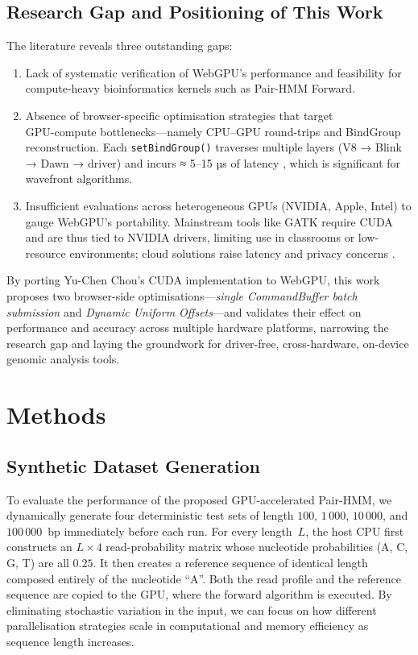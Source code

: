 \documentclass[PhD]{PHlab-thesis}
\begin{document}
\section{Research Gap and Positioning of This Work}
The literature reveals three outstanding gaps:

\begin{enumerate}
  \item Lack of systematic verification of WebGPU's performance and feasibility for compute-heavy bioinformatics kernels such as Pair-HMM Forward.
  \item Absence of browser-specific optimisation strategies that target \\GPU-compute bottlenecks—namely CPU–GPU round-trips and BindGroup reconstruction. Each \verb|setBindGroup()| traverses multiple layers (V8 → Blink → Dawn → driver) and incurs ≈ 5–15 µs of latency \cite{Chrome2024-blog}, which is significant for wavefront algorithms.
  \item Insufficient evaluations across heterogeneous GPUs (NVIDIA, Apple, Intel) to gauge WebGPU's portability. Mainstream tools like GATK require CUDA and are thus tied to NVIDIA drivers, limiting use in classrooms or low-resource environments; cloud solutions raise latency and privacy concerns \cite{Krampis2012}.
\end{enumerate}

By porting Yu-Chen Chou's CUDA implementation to WebGPU, this work proposes two browser-side optimisations—\emph{single CommandBuffer batch submission} and \emph{Dynamic Uniform Offsets}—and validates their effect on performance and accuracy across multiple hardware platforms, narrowing the research gap and laying the groundwork for driver-free, cross-hardware, on-device genomic analysis tools.






\chapter{Methods}
\section{Synthetic Dataset Generation}\label{sec:dataset}
To evaluate the performance of the proposed GPU-accelerated Pair-HMM, we
dynamically generate four deterministic test sets of length
$100$, $1\,000$, $10\,000$, and $100\,000$~bp immediately before each run.
For every length~$L$, the host CPU first constructs an
$L\times4$ read-probability matrix whose nucleotide probabilities
(A, C, G, T) are all $0.25$.
It then creates a reference sequence of identical length composed entirely
of the nucleotide “A”.
Both the read profile and the reference sequence are copied to the GPU,
where the forward algorithm is executed.
By eliminating stochastic variation in the input, we can focus on how
different parallelisation strategies scale in computational and memory
efficiency as sequence length increases.
\end{document}
